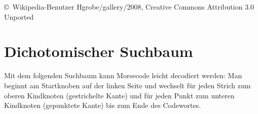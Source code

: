 \documentclass{scrartcl}
\begin{document}
    \vfill
    
    \hfill
    \begin{minipage}[t]{8cm}
      \setlength{\parskip}{.5\baselineskip}
      \scriptsize\color{gray}
      \copyright\ Wikipedia-Benutzer Hgrobe/gallery/2008,
        Creative Commons Attribution 3.0 Unported
    \end{minipage}
    \hfill\strut
    
    \newpage
    
    \section{Dichotomischer Suchbaum}
    
    Mit dem folgenden Suchbaum kann Morsecode leicht decodiert werden:
    Man beginnt am Startknoben auf der linken Seite
    und wechselt für jeden Strich
    zum oberen Kindknoten (gestrichelte Kante)
    und für jeden Punkt zum unteren Kindknoten (gepunktete Kante) bis zum
    Ende des Codewortes. 
    
\end{document}
